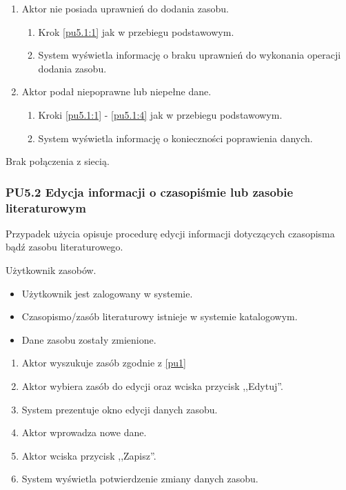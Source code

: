 \begin{enumerate}
\item Aktor nie posiada uprawnień do dodania zasobu.
	\begin{enumerate}[label*=\arabic*.]
		\item Krok \ref{pu5.1:1} jak w przebiegu podstawowym.
		\item System wyświetla informację o braku uprawnień do wykonania operacji dodania zasobu.
	\end{enumerate}
\item Aktor podał niepoprawne lub niepełne dane.
	\begin{enumerate}[label*=\arabic*.]
		\item Kroki \ref{pu5.1:1} - \ref{pu5.1:4} jak w przebiegu podstawowym.
		\item System wyświetla informację o konieczności poprawienia danych.
	\end{enumerate}
\end{enumerate}

Brak połączenia z siecią.

\subsubsection{PU5.2 Edycja informacji o czasopiśmie lub zasobie literaturowym}

Przypadek użycia opisuje procedurę edycji informacji dotyczących czasopisma bądź zasobu literaturowego.

Użytkownik zasobów.

\begin{itemize}
\item Użytkownik jest zalogowany w systemie.
\item Czasopismo/zasób literaturowy istnieje w systemie katalogowym.
\end{itemize}

\begin{itemize}
\item Dane zasobu zostały zmienione.
\end{itemize}

\begin{enumerate}
\item \label{pu5.2:1} Aktor wyszukuje zasób zgodnie z \ref{pu1}
\item \label{pu5.2:2} Aktor wybiera zasób do edycji oraz wciska przycisk ,,Edytuj''.
\item System prezentuje okno edycji danych zasobu.
\item Aktor wprowadza nowe dane.
\item \label{pu5.2:5} Aktor wciska przycisk ,,Zapisz''.
\item System wyświetla potwierdzenie zmiany danych zasobu.
\end{enumerate}

